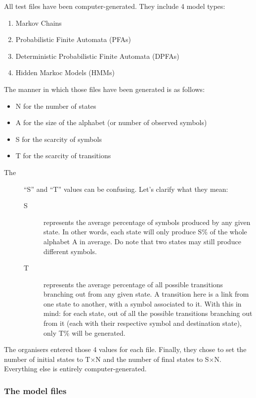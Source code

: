 All test files have been computer-generated. They include 4 model
types:
\begin{enumerate}
\item Markov Chains
\item Probabilistic Finite Automata (PFAs)
\item Deterministic Probabilistic Finite Automata (DPFAs)
\item Hidden Markoc Models (HMMs)
\end{enumerate}
The manner in which those files have been generated is as follows:
\begin{itemize}
\item N for the number of states
\item A for the size of the alphabet (or number of observed symbols)
\item S for the scarcity of symbols
\item T for the scarcity of transitions\end{itemize}
\begin{description}
\item [{\textmd{The}}] ``S'' and ``T'' values can be confusing. Let's
clarify what they mean:

\begin{description}
\item [{S}] represents the average percentage of symbols produced by any
given state. In other words, each state will only produce S\% of the
whole alphabet A in average. Do note that two states may still produce
different symbols.
\item [{T}] represents the average percentage of all possible transitions
branching out from any given state. A transition here is a link from
one state to another, with a symbol associated to it. With this in
mind: for each state, out of all the possible transitions branching
out from it (each with their respective symbol and destination state),
only T\% will be generated.
\end{description}
\end{description}
The organisers entered those 4 values for each file. Finally, they
chose to set the number of initial states to T$\times$N and the number
of final states to S$\times$N. Everything else is entirely computer-generated. 


\subsubsection{The model files}

